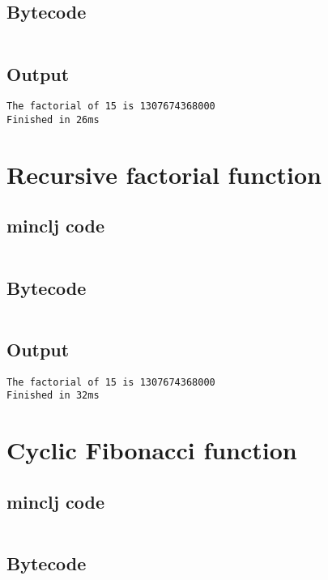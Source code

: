 \documentclass[11pt]{scrreprt}
\begin{document}
\subsection{Bytecode}
\inputminted{text}{/home/mario/git/MarioJim/miniclj/examples/cyclic_factorial.mclj}

\subsection{Output}
\begin{verbatim}
The factorial of 15 is 1307674368000
Finished in 26ms
\end{verbatim}


\section{Recursive factorial function}
\subsection{minclj code}
\inputminted{clojure}{/home/mario/git/MarioJim/miniclj/examples/recursive_factorial.clj}

\subsection{Bytecode}
\inputminted{text}{/home/mario/git/MarioJim/miniclj/examples/recursive_factorial.mclj}

\subsection{Output}
\begin{verbatim}
The factorial of 15 is 1307674368000
Finished in 32ms
\end{verbatim}


\section{Cyclic Fibonacci function}
\subsection{minclj code}
\inputminted{clojure}{/home/mario/git/MarioJim/miniclj/examples/cyclic_fibonacci.clj}

\subsection{Bytecode}
\inputminted{text}{/home/mario/git/MarioJim/miniclj/examples/cyclic_fibonacci.mclj}
\end{document}
